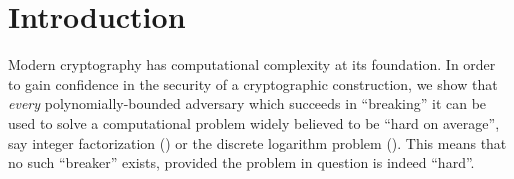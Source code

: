 \chapter{Introduction}
\label{CH:Introduction}
Modern cryptography has computational complexity at its foundation. In order
to gain confidence in the security of a cryptographic construction, we show
that {\it every} polynomially-bounded adversary which succeeds in ``breaking''
it can be used to solve a computational problem widely believed to be ``hard
on average'', say integer factorization (\cite{lenstra:factoring}) or the
discrete logarithm problem (\cite{odlyzko:discretelog}). This means that no
such ``breaker'' exists, provided the problem in question is indeed ``hard''. 



